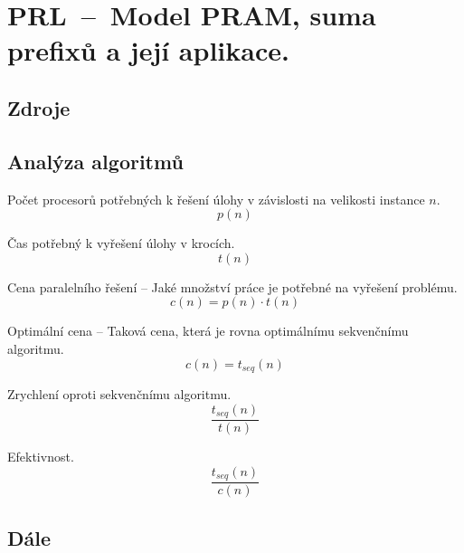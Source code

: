

\graphicspath{{prl/model_pram/figures}}


\chapter{PRL~--~Model PRAM, suma prefixů a její aplikace.}


\section{Zdroje}

\begin{compactitem}
    \item {}
\end{compactitem}


\section{Analýza algoritmů}

\begin{compactitem}
    \item Počet procesorů potřebných k řešení úlohy v závislosti na velikosti instance $n$.
    $$ p(n) $$

    \item Čas potřebný k vyřešení úlohy v krocích.
    $$ t(n) $$

    \item Cena paralelního řešení -- Jaké množství práce je potřebné na vyřešení problému.
    $$ c(n) = p(n) \cdot t(n) $$

    \item Optimální cena -- Taková cena, která je rovna optimálnímu sekvenčnímu algoritmu.
    $$ c(n) = t_{seq}(n) $$

    \item Zrychlení oproti sekvenčnímu algoritmu.
    $$ \displaystyle{ \frac{ t_{seq}(n) }{ t(n) } } $$

    \item Efektivnost.
    $$ \displaystyle{ \frac{ t_{seq}(n) }{ c(n) } } $$
\end{compactitem}


\section{Dále}

\begin{compactitem}
    \item {}
\end{compactitem}
